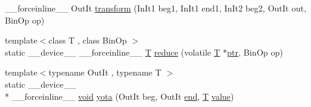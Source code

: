 \begin{DoxyCompactItemize}
\-\_\-\-\_\-forceinline\-\_\-\-\_\- Out\-It \hyperlink{structcv_1_1gpu_1_1device_1_1Warp_abc63734bc10f6b1119aa488caddd2210}{transform} (In\-It1 beg1, In\-It1 end1, In\-It2 beg2, Out\-It out, Bin\-Op op)
\item 
{\footnotesize template$<$class T , class Bin\-Op $>$ }\\static \-\_\-\-\_\-device\-\_\-\-\_\- \-\_\-\-\_\-forceinline\-\_\-\-\_\- \hyperlink{calib3d_8hpp_a3efb9551a871ddd0463079a808916717}{T} \hyperlink{structcv_1_1gpu_1_1device_1_1Warp_ab35daeffc6c8ce4ca0f71a19c90f629c}{reduce} (volatile \hyperlink{calib3d_8hpp_a3efb9551a871ddd0463079a808916717}{T} $\ast$\hyperlink{core__c_8h_a166529da793cc1ef241cff347f3db5a5}{ptr}, Bin\-Op op)
\item 
{\footnotesize template$<$typename Out\-It , typename T $>$ }\\static \-\_\-\-\_\-device\-\_\-\-\_\- \\*
\-\_\-\-\_\-forceinline\-\_\-\-\_\- \hyperlink{legacy_8hpp_a8bb47f092d473522721002c86c13b94e}{void} \hyperlink{structcv_1_1gpu_1_1device_1_1Warp_a7e34fbaba4e973e00e942a9d5765e161}{yota} (Out\-It beg, Out\-It \hyperlink{legacy_8hpp_ab21668ff869102944cbf3bb534bba27d}{end}, \hyperlink{calib3d_8hpp_a3efb9551a871ddd0463079a808916717}{T} \hyperlink{highgui__c_8h_ad4670c92695d4327c21292905a803901}{value})
\end{DoxyCompactItemize}


